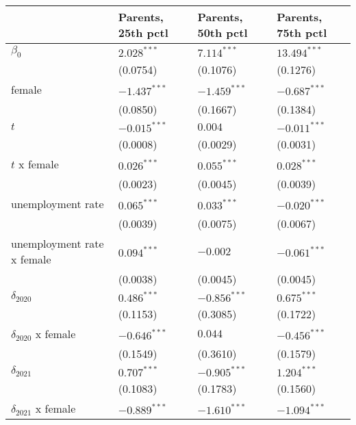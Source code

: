 \begin{tabular}{llll}
\toprule
{} & Parents, 25th pctl & Parents, 50th pctl & Parents, 75th pctl \\
\midrule
$\beta_0$                  &      $2.028^{***}$ &      $7.114^{***}$ &     $13.494^{***}$ \\
                           &           (0.0754) &           (0.1076) &           (0.1276) \\
female                     &     $-1.437^{***}$ &     $-1.459^{***}$ &     $-0.687^{***}$ \\
                           &           (0.0850) &           (0.1667) &           (0.1384) \\
$t$                        &     $-0.015^{***}$ &            $0.004$ &     $-0.011^{***}$ \\
                           &           (0.0008) &           (0.0029) &           (0.0031) \\
$t$ x female               &      $0.026^{***}$ &      $0.055^{***}$ &      $0.028^{***}$ \\
                           &           (0.0023) &           (0.0045) &           (0.0039) \\
unemployment rate          &      $0.065^{***}$ &      $0.033^{***}$ &     $-0.020^{***}$ \\
                           &           (0.0039) &           (0.0075) &           (0.0067) \\
unemployment rate x female &      $0.094^{***}$ &           $-0.002$ &     $-0.061^{***}$ \\
                           &           (0.0038) &           (0.0045) &           (0.0045) \\
$\delta_{2020}$            &      $0.486^{***}$ &     $-0.856^{***}$ &      $0.675^{***}$ \\
                           &           (0.1153) &           (0.3085) &           (0.1722) \\
$\delta_{2020}$ x female   &     $-0.646^{***}$ &            $0.044$ &     $-0.456^{***}$ \\
                           &           (0.1549) &           (0.3610) &           (0.1579) \\
$\delta_{2021}$            &      $0.707^{***}$ &     $-0.905^{***}$ &      $1.204^{***}$ \\
                           &           (0.1083) &           (0.1783) &           (0.1560) \\
$\delta_{2021}$ x female   &     $-0.889^{***}$ &     $-1.610^{***}$ &     $-1.094^{***}$ \\

\end{tabular}
